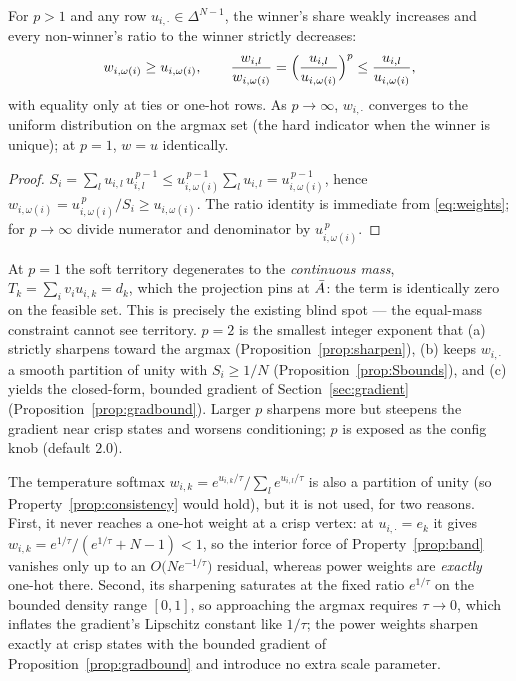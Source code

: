 \documentclass[11pt,a4paper]{article}
\begin{document}
\begin{prop}
\label{prop:sharpen}
For $p>1$ and any row $u_{i,\cdot}\in\Delta^{N-1}$, the winner's share weakly
increases and every non-winner's ratio to the winner strictly decreases:
\[
  w_{i,\omega(i)} \ge u_{i,\omega(i)},
  \qquad
  \frac{w_{i,l}}{w_{i,\omega(i)}}
   = \Bigl(\frac{u_{i,l}}{u_{i,\omega(i)}}\Bigr)^{p}
   \le \frac{u_{i,l}}{u_{i,\omega(i)}} ,
\]
with equality only at ties or one-hot rows. As $p\to\infty$,
$w_{i,\cdot}$ converges to the uniform distribution on the argmax set
(the hard indicator when the winner is unique); at $p=1$, $w=u$ identically.
\end{prop}

\begin{proof}
$S_i=\sum_l u_{i,l}\,u_{i,l}^{\,p-1}\le u_{i,\omega(i)}^{\,p-1}\sum_l u_{i,l}
 = u_{i,\omega(i)}^{\,p-1}$, hence
$w_{i,\omega(i)}=u_{i,\omega(i)}^{\,p}/S_i \ge u_{i,\omega(i)}$. The ratio
identity is immediate from \eqref{eq:weights}; for $p\to\infty$ divide
numerator and denominator by $u_{i,\omega(i)}^{\,p}$.
\end{proof}

\begin{remark}[Why $p=2$ is the default, and $p=1$ is the blind spot]
\label{rem:p2}
At $p=1$ the soft territory degenerates to the \emph{continuous mass},
$T_k=\sum_i v_i u_{i,k} = d_k$, which the projection pins at $\bar{A}$: the
term is identically zero on the feasible set. This is precisely the existing
blind spot — the equal-mass constraint cannot see territory. $p=2$ is the
smallest integer exponent that (a) strictly sharpens toward the argmax
(Proposition~\ref{prop:sharpen}), (b) keeps $w_{i,\cdot}$ a smooth partition
of unity with $S_i\ge 1/N$ (Proposition~\ref{prop:Sbounds}), and (c) yields
the closed-form, bounded gradient of Section~\ref{sec:gradient}
(Proposition~\ref{prop:gradbound}). Larger $p$ sharpens more but steepens the
gradient near crisp states and worsens conditioning; $p$ is exposed as the
config knob  (default $2.0$).
\end{remark}

\begin{remark}
\label{rem:softmax}
The temperature softmax $w_{i,k}=e^{u_{i,k}/\tau}/\sum_l e^{u_{i,l}/\tau}$ is
also a partition of unity (so Property~\ref{prop:consistency} would hold), but
it is not used, for two reasons. First, it never reaches a one-hot weight at a
crisp vertex: at $u_{i,\cdot}=e_k$ it gives
$w_{i,k}=e^{1/\tau}/(e^{1/\tau}+N-1)<1$, so the interior force of
Property~\ref{prop:band} vanishes only up to an $O\!\bigl(N e^{-1/\tau}\bigr)$
residual, whereas power weights are \emph{exactly} one-hot there. Second, its
sharpening saturates at the fixed ratio $e^{1/\tau}$ on the bounded density
range $[0,1]$, so approaching the argmax requires $\tau\to0$, which inflates
the gradient's Lipschitz constant like $1/\tau$; the power weights sharpen
exactly at crisp states with the bounded gradient of
Proposition~\ref{prop:gradbound} and introduce no extra scale parameter.
\end{remark}
\end{document}
